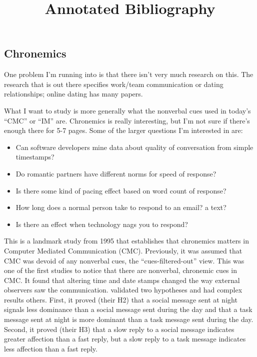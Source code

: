 \documentclass[
]{article}
\title{Annotated Bibliography}
\author{}
\date{\vspace{-2.5em}}
\providecommand{\tightlist}{%
  \setlength{\itemsep}{0pt}\setlength{\parskip}{0pt}}
\begin{document}
\maketitle

\hypertarget{chronemics}{%
\subsection{Chronemics}\label{chronemics}}

One problem I'm running into is that there isn't very much research on
this. The research that is out there specifies work/team communication
or dating relationships; online dating has many papers.

What I want to study is more generally what the nonverbal cues used in
today's ``CMC'' or ``IM'' are. Chronemics is really interesting, but I'm
not sure if there's enough there for 5-7 pages. Some of the larger
questions I'm interested in are:

\begin{itemize}
\tightlist
\item
  Can software developers mine data about quality of conversation from
  simple timestamps?
\item
  Do romantic partners have different norms for speed of response?
\item
  Is there some kind of pacing effect based on word count of response?
\item
  How long does a normal person take to respond to an email? a text?
\item
  Is there an effect when technology nags you to respond?
\end{itemize}

\textbf{}

This is a landmark study from 1995 that establishes that chronemics
matters in Computer Mediated Communication (CMC). Previously, it was
assumed that CMC was devoid of any nonverbal cues, the
``cues-filtered-out'' view. This was one of the first studies to notice
that there are nonverbal, chronemic cues in CMC. It found that altering
time and date stamps changed the way external observers saw the
communication. \textcite{walther95} validated two hypotheses and had
complex results others. First, it proved (their H2) that a social
message sent at night signals less dominance than a social message sent
during the day and that a task message sent at night is more dominant
than a task message sent during the day. Second, it proved (their H3)
that a slow reply to a social message indicates greater affection than a
fast reply, but a slow reply to a task message indicates less affection
than a fast reply.
\end{document}
